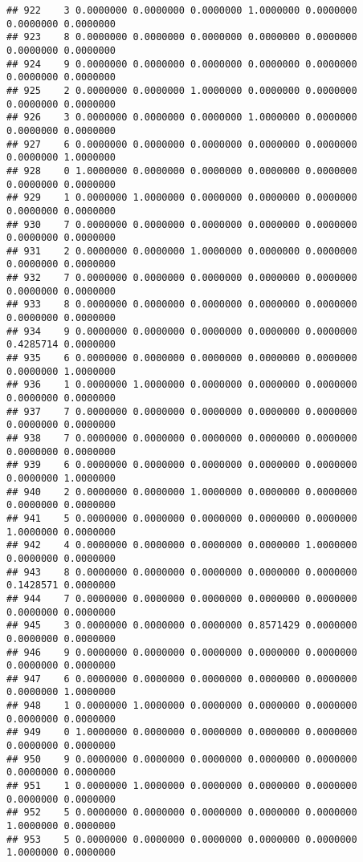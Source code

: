 \documentclass[
]{article}
\begin{document}
\begin{verbatim}
## 922    3 0.0000000 0.0000000 0.0000000 1.0000000 0.0000000 0.0000000 0.0000000
## 923    8 0.0000000 0.0000000 0.0000000 0.0000000 0.0000000 0.0000000 0.0000000
## 924    9 0.0000000 0.0000000 0.0000000 0.0000000 0.0000000 0.0000000 0.0000000
## 925    2 0.0000000 0.0000000 1.0000000 0.0000000 0.0000000 0.0000000 0.0000000
## 926    3 0.0000000 0.0000000 0.0000000 1.0000000 0.0000000 0.0000000 0.0000000
## 927    6 0.0000000 0.0000000 0.0000000 0.0000000 0.0000000 0.0000000 1.0000000
## 928    0 1.0000000 0.0000000 0.0000000 0.0000000 0.0000000 0.0000000 0.0000000
## 929    1 0.0000000 1.0000000 0.0000000 0.0000000 0.0000000 0.0000000 0.0000000
## 930    7 0.0000000 0.0000000 0.0000000 0.0000000 0.0000000 0.0000000 0.0000000
## 931    2 0.0000000 0.0000000 1.0000000 0.0000000 0.0000000 0.0000000 0.0000000
## 932    7 0.0000000 0.0000000 0.0000000 0.0000000 0.0000000 0.0000000 0.0000000
## 933    8 0.0000000 0.0000000 0.0000000 0.0000000 0.0000000 0.0000000 0.0000000
## 934    9 0.0000000 0.0000000 0.0000000 0.0000000 0.0000000 0.4285714 0.0000000
## 935    6 0.0000000 0.0000000 0.0000000 0.0000000 0.0000000 0.0000000 1.0000000
## 936    1 0.0000000 1.0000000 0.0000000 0.0000000 0.0000000 0.0000000 0.0000000
## 937    7 0.0000000 0.0000000 0.0000000 0.0000000 0.0000000 0.0000000 0.0000000
## 938    7 0.0000000 0.0000000 0.0000000 0.0000000 0.0000000 0.0000000 0.0000000
## 939    6 0.0000000 0.0000000 0.0000000 0.0000000 0.0000000 0.0000000 1.0000000
## 940    2 0.0000000 0.0000000 1.0000000 0.0000000 0.0000000 0.0000000 0.0000000
## 941    5 0.0000000 0.0000000 0.0000000 0.0000000 0.0000000 1.0000000 0.0000000
## 942    4 0.0000000 0.0000000 0.0000000 0.0000000 1.0000000 0.0000000 0.0000000
## 943    8 0.0000000 0.0000000 0.0000000 0.0000000 0.0000000 0.1428571 0.0000000
## 944    7 0.0000000 0.0000000 0.0000000 0.0000000 0.0000000 0.0000000 0.0000000
## 945    3 0.0000000 0.0000000 0.0000000 0.8571429 0.0000000 0.0000000 0.0000000
## 946    9 0.0000000 0.0000000 0.0000000 0.0000000 0.0000000 0.0000000 0.0000000
## 947    6 0.0000000 0.0000000 0.0000000 0.0000000 0.0000000 0.0000000 1.0000000
## 948    1 0.0000000 1.0000000 0.0000000 0.0000000 0.0000000 0.0000000 0.0000000
## 949    0 1.0000000 0.0000000 0.0000000 0.0000000 0.0000000 0.0000000 0.0000000
## 950    9 0.0000000 0.0000000 0.0000000 0.0000000 0.0000000 0.0000000 0.0000000
## 951    1 0.0000000 1.0000000 0.0000000 0.0000000 0.0000000 0.0000000 0.0000000
## 952    5 0.0000000 0.0000000 0.0000000 0.0000000 0.0000000 1.0000000 0.0000000
## 953    5 0.0000000 0.0000000 0.0000000 0.0000000 0.0000000 1.0000000 0.0000000

\end{verbatim}
\end{document}

